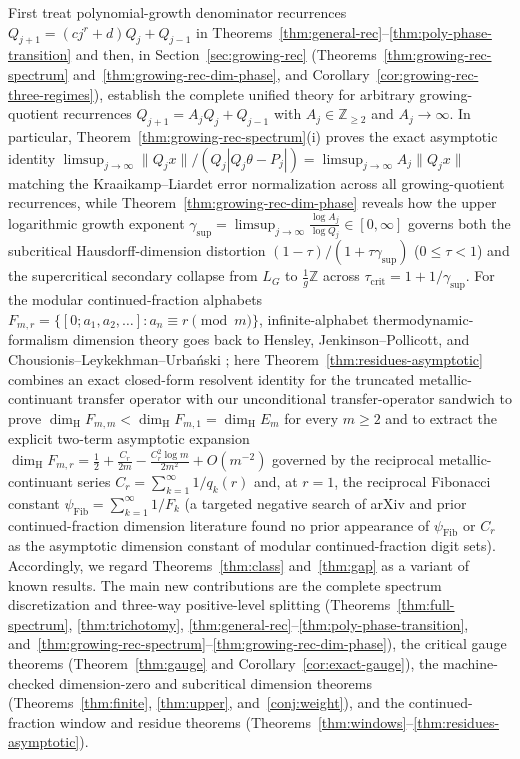 \documentclass[11pt]{article}
\theoremstyle{definition}
\theoremstyle{remark}
\newcommand{\Z}{\mathbb{Z}}
\newcommand{\dimH}{\dim_{\mathrm{H}}}
\begin{document}
First treat polynomial-growth denominator recurrences
$Q_{j+1}=(cj^r+d)Q_j+Q_{j-1}$ in
Theorems~\ref{thm:general-rec}--\ref{thm:poly-phase-transition} and then, in
Section~\ref{sec:growing-rec} (Theorems~\ref{thm:growing-rec-spectrum}
and~\ref{thm:growing-rec-dim-phase}, and
Corollary~\ref{cor:growing-rec-three-regimes}), establish the complete unified
theory for arbitrary growing-quotient recurrences $Q_{j+1}=A_jQ_j+Q_{j-1}$ with
$A_j\in\Z_{\ge2}$ and $A_j\to\infty$. In particular, Theorem~\ref{thm:growing-rec-spectrum}(i)
proves the exact asymptotic identity
$\limsup_{j\to\infty}\|Q_jx\|/(Q_j|Q_j\theta-P_j|)=\limsup_{j\to\infty}A_j\|Q_jx\|$
matching the Kraaikamp--Liardet error normalization across all growing-quotient
recurrences, while Theorem~\ref{thm:growing-rec-dim-phase} reveals how the upper
logarithmic growth exponent $\gamma_{\sup}=\limsup_{j\to\infty}\frac{\log A_j}{\log Q_j}\in[0,\infty]$
governs both the subcritical Hausdorff-dimension distortion
$(1-\tau)/(1+\tau\gamma_{\sup})$ ($0\le\tau<1$) and the supercritical secondary
collapse from $L_G$ to $\frac{1}{g}\Z$ across $\tau_{\mathrm{crit}}=1+1/\gamma_{\sup}$.
For the modular continued-fraction alphabets $F_{m,r}=\{[0;a_1,a_2,\dots]:a_n\equiv r\pmod m\}$,
infinite-alphabet thermodynamic-formalism dimension theory goes back to Hensley,
Jenkinson--Pollicott, and Chousionis--Leykekhman--Urba\'nski \cite{CLU}; here
Theorem~\ref{thm:residues-asymptotic} combines an exact closed-form resolvent
identity for the truncated metallic-continuant transfer operator with our
unconditional transfer-operator sandwich to prove $\dimH F_{m,m}<\dimH F_{m,1}=\dimH E_m$
for every $m\ge2$ and to extract the explicit two-term asymptotic expansion
$\dimH F_{m,r}=\frac12+\frac{C_r}{2m}-\frac{C_r^2\log m}{2m^2}+O(m^{-2})$ governed
by the reciprocal metallic-continuant series $C_r=\sum_{k=1}^\infty 1/q_k(r)$ and,
at $r=1$, the reciprocal Fibonacci constant $\psi_{\mathrm{Fib}}=\sum_{k=1}^\infty 1/F_k$
(a targeted negative search of arXiv and prior continued-fraction dimension
literature found no prior appearance of $\psi_{\mathrm{Fib}}$ or $C_r$ as the
asymptotic dimension constant of modular continued-fraction digit sets).
Accordingly, we
regard Theorems~\ref{thm:class} and~\ref{thm:gap} as a variant of known results.
The main new contributions are the complete spectrum discretization and
three-way positive-level splitting (Theorems~\ref{thm:full-spectrum},
\ref{thm:trichotomy}, \ref{thm:general-rec}--\ref{thm:poly-phase-transition},
and~\ref{thm:growing-rec-spectrum}--\ref{thm:growing-rec-dim-phase}), the critical gauge theorems
(Theorem~\ref{thm:gauge} and Corollary~\ref{cor:exact-gauge}), the machine-checked
dimension-zero and subcritical dimension theorems (Theorems~\ref{thm:finite},
\ref{thm:upper}, and~\ref{conj:weight}), and the continued-fraction window and
residue theorems (Theorems~\ref{thm:windows}--\ref{thm:residues-asymptotic}).
\end{document}
